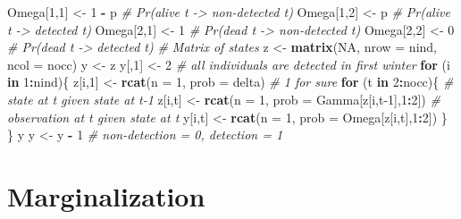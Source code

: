 \documentclass[
  12pt,
]{krantz}
\newenvironment{Shaded}{\begin{snugshade}}{\end{snugshade}}
\newcommand{\AttributeTok}[1]{\textcolor[rgb]{0.13,0.29,0.53}{#1}}
\newcommand{\CommentTok}[1]{\textcolor[rgb]{0.56,0.35,0.01}{\textit{#1}}}
\newcommand{\ConstantTok}[1]{\textcolor[rgb]{0.56,0.35,0.01}{#1}}
\newcommand{\ControlFlowTok}[1]{\textcolor[rgb]{0.13,0.29,0.53}{\textbf{#1}}}
\newcommand{\DecValTok}[1]{\textcolor[rgb]{0.00,0.00,0.81}{#1}}
\newcommand{\FunctionTok}[1]{\textcolor[rgb]{0.13,0.29,0.53}{\textbf{#1}}}
\newcommand{\NormalTok}[1]{#1}
\newcommand{\OtherTok}[1]{\textcolor[rgb]{0.56,0.35,0.01}{#1}}
\newcommand{\SpecialCharTok}[1]{\textcolor[rgb]{0.81,0.36,0.00}{\textbf{#1}}}
\begin{document}
\begin{Shaded}
\begin{Highlighting}[]
\NormalTok{Omega[}\DecValTok{1}\NormalTok{,}\DecValTok{1}\NormalTok{] }\OtherTok{\textless{}{-}} \DecValTok{1} \SpecialCharTok{{-}}\NormalTok{ p      }\CommentTok{\# Pr(alive t {-}\textgreater{} non{-}detected t)}
\NormalTok{Omega[}\DecValTok{1}\NormalTok{,}\DecValTok{2}\NormalTok{] }\OtherTok{\textless{}{-}}\NormalTok{ p          }\CommentTok{\# Pr(alive t {-}\textgreater{} detected t)}
\NormalTok{Omega[}\DecValTok{2}\NormalTok{,}\DecValTok{1}\NormalTok{] }\OtherTok{\textless{}{-}} \DecValTok{1}          \CommentTok{\# Pr(dead t {-}\textgreater{} non{-}detected t)}
\NormalTok{Omega[}\DecValTok{2}\NormalTok{,}\DecValTok{2}\NormalTok{] }\OtherTok{\textless{}{-}} \DecValTok{0}          \CommentTok{\# Pr(dead t {-}\textgreater{} detected t)}
\CommentTok{\# Matrix of states}
\NormalTok{z }\OtherTok{\textless{}{-}} \FunctionTok{matrix}\NormalTok{(}\ConstantTok{NA}\NormalTok{, }\AttributeTok{nrow =}\NormalTok{ nind, }\AttributeTok{ncol =}\NormalTok{ nocc)}
\NormalTok{y }\OtherTok{\textless{}{-}}\NormalTok{ z}
\NormalTok{y[,}\DecValTok{1}\NormalTok{] }\OtherTok{\textless{}{-}} \DecValTok{2} \CommentTok{\# all individuals are detected in first winter}
\ControlFlowTok{for}\NormalTok{ (i }\ControlFlowTok{in} \DecValTok{1}\SpecialCharTok{:}\NormalTok{nind)\{}
\NormalTok{  z[i,}\DecValTok{1}\NormalTok{] }\OtherTok{\textless{}{-}} \FunctionTok{rcat}\NormalTok{(}\AttributeTok{n =} \DecValTok{1}\NormalTok{, }\AttributeTok{prob =}\NormalTok{ delta) }\CommentTok{\# 1 for sure}
  \ControlFlowTok{for}\NormalTok{ (t }\ControlFlowTok{in} \DecValTok{2}\SpecialCharTok{:}\NormalTok{nocc)\{}
    \CommentTok{\# state at t given state at t{-}1}
\NormalTok{    z[i,t] }\OtherTok{\textless{}{-}} \FunctionTok{rcat}\NormalTok{(}\AttributeTok{n =} \DecValTok{1}\NormalTok{, }\AttributeTok{prob =}\NormalTok{ Gamma[z[i,t}\DecValTok{{-}1}\NormalTok{],}\DecValTok{1}\SpecialCharTok{:}\DecValTok{2}\NormalTok{]) }
    \CommentTok{\# observation at t given state at t}
\NormalTok{    y[i,t] }\OtherTok{\textless{}{-}} \FunctionTok{rcat}\NormalTok{(}\AttributeTok{n =} \DecValTok{1}\NormalTok{, }\AttributeTok{prob =}\NormalTok{ Omega[z[i,t],}\DecValTok{1}\SpecialCharTok{:}\DecValTok{2}\NormalTok{]) }
\NormalTok{  \}}
\NormalTok{\}}
\NormalTok{y}
\NormalTok{y }\OtherTok{\textless{}{-}}\NormalTok{ y }\SpecialCharTok{{-}} \DecValTok{1} \CommentTok{\# non{-}detection = 0, detection = 1}
\end{Highlighting}
\end{Shaded}

\hypertarget{marginalization}{%
\section{Marginalization}\label{marginalization}}
\end{document}
